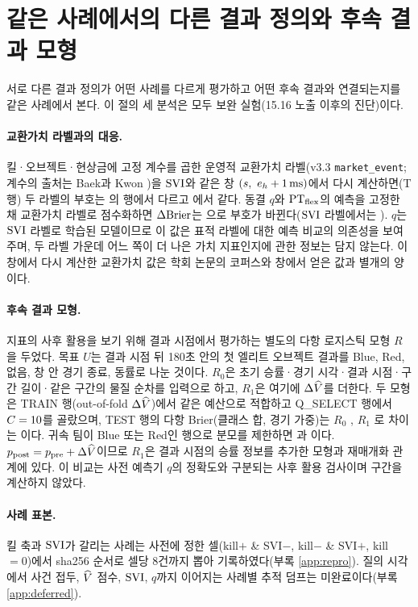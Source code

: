 \section{같은 사례에서의 다른 결과 정의와 후속 결과 모형}
\label{sec:value-samecase}

서로 다른 결과 정의가 어떤 사례를 다르게 평가하고 어떤 후속 결과와 연결되는지를 같은 사례에서 본다. 이 절의 세 분석은 모두 보완 실험(15.16 노출 이후의 진단)이다.

\paragraph{교환가치 라벨과의 대응.} 킬·오브젝트·현상금에 고정 계수를 곱한 운영적 교환가치 라벨(v3.3 \texttt{market\_event}; 계수의 출처는 Baek과 Kwon \cite{baek2026killconditioned})을 $\mathrm{SVI}$와 같은 창 $(s,\ e_{h} + 1\,\text{ms})$에서 다시 계산하면(T \meN{} 행) 두 라벨의 부호는 \meFlip{}의 행에서 다르고 \meAgree{}에서 같다. 동결 $q$와 $\mathrm{PT}_{\mathrm{flex}}$의 예측을 고정한 채 교환가치 라벨로 점수화하면 $\Delta\mathrm{Brier}$는 \meDbMarket{}으로 부호가 바뀐다($\mathrm{SVI}$ 라벨에서는 \meDbSvi{}). $q$는 $\mathrm{SVI}$ 라벨로 학습된 모델이므로 이 값은 표적 라벨에 대한 예측 비교의 의존성을 보여 주며, 두 라벨 가운데 어느 쪽이 더 나은 가치 지표인지에 관한 정보는 담지 않는다. 이 창에서 다시 계산한 교환가치 값은 학회 논문의 코퍼스와 창에서 얻은 값과 별개의 양이다.

\paragraph{후속 결과 모형.} 지표의 사후 활용을 보기 위해 결과 시점에서 평가하는 별도의 다항 로지스틱 모형 $R$을 두었다. 목표 $U$는 결과 시점 뒤 180초 안의 첫 엘리트 오브젝트 결과를 Blue, Red, 없음, 창 안 경기 종료, 동률로 나눈 것이다. $R_0$은 초기 승률·경기 시각·결과 시점·구간 길이·같은 구간의 물질 순차를 입력으로 하고, $R_1$은 여기에 $\Delta\widehat V$를 더한다. 두 모형은 TRAIN \rTrainN{} 행(out-of-fold $\Delta\widehat V$)에서 같은 예산으로 적합하고 Q\_SELECT \rQselN{} 행에서 $C = 10$를 골랐으며, TEST \rTestN{} 행의 다항 Brier(클래스 합, 경기 가중)는 $R_0$ \rZeroBrier{}, $R_1$ \rOneBrier{}로 차이는 \rDelta{}이다. 귀속 팀이 Blue 또는 Red인 행으로 분모를 제한하면 \rZeroBR{}과 \rOneBR{}이다. $p_{\mathrm{post}} = p_{\mathrm{pre}} + \Delta\widehat V$이므로 $R_1$은 결과 시점의 승률 정보를 추가한 모형과 재매개화 관계에 있다. 이 비교는 사전 예측기 $q$의 정확도와 구분되는 사후 활용 검사이며 구간을 계산하지 않았다.

\paragraph{사례 표본.} 킬 축과 $\mathrm{SVI}$가 갈리는 사례는 사전에 정한 셀(kill$+$ \& SVI$-$, kill$-$ \& SVI$+$, kill $= 0$)에서 sha256 순서로 셀당 8건까지 뽑아 기록하였다(부록 \ref{app:repro}). 질의 시각에서 사건 접두, $\widehat V$ 점수, $\mathrm{SVI}$, $q$까지 이어지는 사례별 추적 덤프는 미완료이다(부록 \ref{app:deferred}).
